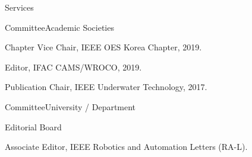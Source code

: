\begin{rSection}{Services}

\begin{rSubsection}{Committee}{}{Academic Societies}{}

  \item Chapter Vice Chair, IEEE OES Korea Chapter, 2019.
  \item Editor, IFAC CAMS/WROCO, 2019.


  \item Publication Chair, IEEE Underwater Technology, 2017.
  
\end{rSubsection}

\begin{rSubsection}{Committee}{}{University / Department}{}


\end{rSubsection}



\begin{rSubsection}{Editorial Board}{}{}{}
  \item Associate Editor, IEEE Robotics and Automation Letters (RA-L).
\end{rSubsection}


\end{rSection}
